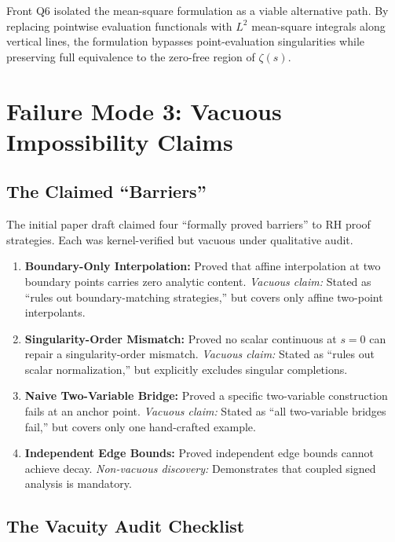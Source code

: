 \documentclass[11pt,a4paper]{article}
\theoremstyle{definition}
\theoremstyle{remark}
\begin{document}
Front Q6 isolated the mean-square formulation as a viable alternative path. By replacing pointwise evaluation functionals with $L^2$ mean-square integrals along vertical lines, the formulation bypasses point-evaluation singularities while preserving full equivalence to the zero-free region of $\zeta(s)$.

\section{Failure Mode 3: Vacuous Impossibility Claims}
\label{sec:failure3}

\subsection{The Claimed ``Barriers''}

The initial paper draft claimed four ``formally proved barriers'' to RH proof strategies. Each was kernel-verified but vacuous under qualitative audit.

\begin{enumerate}[label=\textbf{\arabic*.}]
  \item \textbf{Boundary-Only Interpolation:} Proved that affine interpolation at two boundary points carries zero analytic content. \emph{Vacuous claim:} Stated as ``rules out boundary-matching strategies,'' but covers only affine two-point interpolants.
  \item \textbf{Singularity-Order Mismatch:} Proved no scalar continuous at $s=0$ can repair a singularity-order mismatch. \emph{Vacuous claim:} Stated as ``rules out scalar normalization,'' but explicitly excludes singular completions.
  \item \textbf{Naive Two-Variable Bridge:} Proved a specific two-variable construction fails at an anchor point. \emph{Vacuous claim:} Stated as ``all two-variable bridges fail,'' but covers only one hand-crafted example.
  \item \textbf{Independent Edge Bounds:} Proved independent edge bounds cannot achieve decay. \emph{Non-vacuous discovery:} Demonstrates that coupled signed analysis is mandatory.
\end{enumerate}

\subsection{The Vacuity Audit Checklist}
\end{document}
